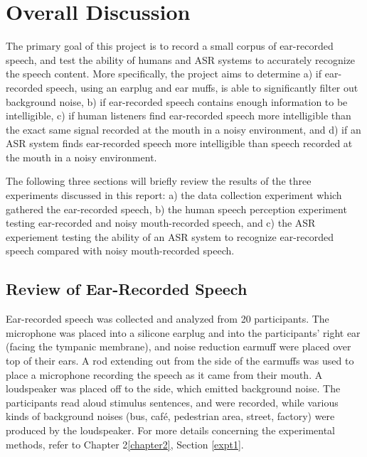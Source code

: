% 
% 
% 

\chapter{Overall Discussion\label{chapter5}}


The primary goal of this project is to record a small corpus of ear-recorded speech, and test the ability of humans and ASR systems to accurately recognize the speech content.  More specifically, the project aims to determine a) if ear-recorded speech, using an earplug and ear muffs, is able to significantly filter out background noise, b) if ear-recorded speech contains enough information to be intelligible, c) if human listeners find ear-recorded speech more intelligible than the exact same signal recorded at the mouth in a noisy environment, and d) if an ASR system finds ear-recorded speech more intelligible than speech recorded at the mouth in a noisy environment.

The following three sections will briefly review the results of the three experiments discussed in this report: a) the data collection experiment which gathered the ear-recorded speech, b) the human speech perception experiment testing ear-recorded and noisy mouth-recorded speech, and c) the ASR experiement testing the ability of an ASR system to recognize ear-recorded speech compared with noisy mouth-recorded speech.


\section{Review of Ear-Recorded Speech}\label{sec:chap2-review}

Ear-recorded speech was collected and analyzed from 20 participants.  The microphone was placed into a silicone earplug and into the participants' right ear (facing the tympanic membrane), and noise reduction earmuff were placed over top of their ears.  A rod extending out from the side of the earmuffs was used to place a microphone recording the speech as it came from their mouth.  A loudspeaker was placed off to the side, which emitted background noise.  The participants read aloud stimulus sentences, and were recorded, while various kinds of background noises (bus, caf\'{e}, pedestrian area, street, factory) were produced by the loudspeaker.  For more details concerning the experimental methods, refer to Chapter 2\ref{chapter2}, Section \ref{expt1}.

